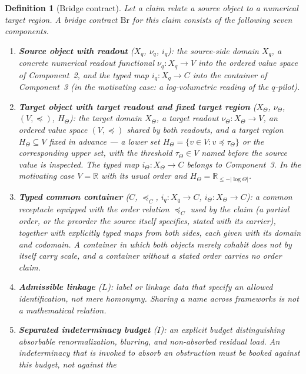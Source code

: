 \documentclass[11pt,a4paper]{article}
\newtheorem{definition}{Definition}[section]
\begin{document}
\begin{definition}[Bridge contract]\label{def:bridge}
Let a claim relate a source object to a numerical target region. A
\emph{bridge contract} $\mathrm{Br}$ for this claim consists of the following
seven components.
\begin{enumerate}
  \item \textbf{Source object with readout} ($X_q$, $\nu_q$, $i_q$): the
    source-side domain $X_q$, a concrete numerical readout functional
    $\nu_q\colon X_q \to V$ into the ordered value space of Component~2, and
    the typed map $i_q\colon X_q \to C$ into the container of Component~3 (in
    the motivating case: a log-volumetric reading of the $q$-pilot).
  \item \textbf{Target object with target readout and fixed target region}
    ($X_\Theta$, $\nu_\Theta$, $(V,\preceq)$, $H_\Theta$): the target
    domain $X_\Theta$, a target readout $\nu_\Theta\colon X_\Theta \to V$, an
    ordered value space $(V,\preceq)$ shared by both readouts, and a target
    region $H_\Theta \subseteq V$ fixed \emph{in advance} --- a lower set
    $H_\Theta = \{v \in V : v \preceq \tau_\Theta\}$ or the corresponding
    upper set, with the threshold $\tau_\Theta \in V$ named before the source
    value is inspected. The typed map $i_\Theta\colon X_\Theta \to C$ belongs
    to Component~3. In the motivating case $V = \mathbb{R}$ with its usual
    order and $H_\Theta = \mathbb{R}_{\le -|\log\Theta|}$.
  \item \textbf{Typed common container} ($C$, $\preceq_C$,
    $i_q\colon X_q \to C$, $i_\Theta\colon X_\Theta \to C$): a common
    receptacle equipped with the order relation $\preceq_C$ used by the
    claim (a partial order, or the preorder the source itself specifies,
    stated with its carrier), together with \emph{explicitly typed} maps
    from both sides, each given with its domain and codomain. A container in
    which both objects merely cohabit does not by itself carry scale, and a
    container without a stated order carries no order claim.
  \item \textbf{Admissible linkage} ($L$): label or linkage data that specify
    an \emph{allowed identification}, not mere homonymy. Sharing a name across
    frameworks is not a mathematical relation.
  \item \textbf{Separated indeterminacy budget} ($I$): an explicit budget
    distinguishing absorbable renormalization, blurring, and
    \emph{non-absorbed residual load}. An indeterminacy that is invoked to
    absorb an obstruction must be booked against this budget, not against the

\end{enumerate}
\end{definition}
\end{document}
